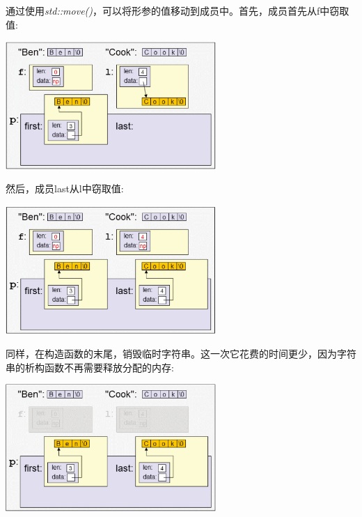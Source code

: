 通过使用\textit{std::move()}，可以将形参的值移动到成员中。首先，成员首先从f中窃取值:\par

\begin{center}
	\includegraphics[width=0.6\textwidth]{content/1/chapter4/images/5}
\end{center}

然后，成员last从l中窃取值:\par

\begin{center}
	\includegraphics[width=0.6\textwidth]{content/1/chapter4/images/6}
\end{center}

同样，在构造函数的末尾，销毁临时字符串。这一次它花费的时间更少，因为字符串的析构函数不再需要释放分配的内存:\par

\begin{center}
	\includegraphics[width=0.6\textwidth]{content/1/chapter4/images/7}
\end{center}


